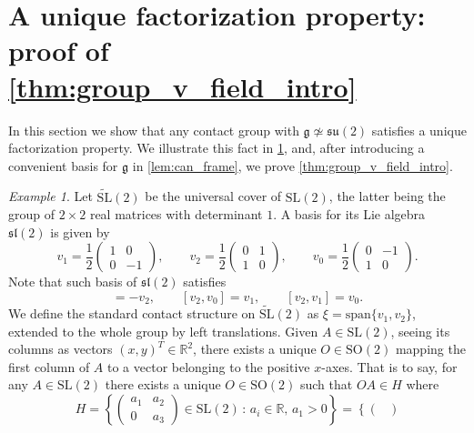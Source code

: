 \documentclass[reqno]{amsart}
\theoremstyle{remark}
\newtheorem{example}[theorem]{Example}
\theoremstyle{plain}
\begin{document}
\section{A unique factorization property: proof of \cref{thm:group_v_field_intro}}\label{4sec:groups}
In this section we show that any contact group with $\mathfrak g\not\simeq \mathfrak{su}(2) $ satisfies a unique factorization property. We illustrate this fact in \cref{ex:st_sl2}, and, after introducing a convenient basis for $\mathfrak g$ in \cref{lem:can_frame}, we prove \cref{thm:group_v_field_intro}.
\begin{example}\label{ex:st_sl2}
    Let $\widetilde{\mathrm{SL}}(2)$ be the universal cover of $\mathrm{SL}(2)$, the latter being the group of $2\times 2$ real matrices with determinant $1$.  A basis for its Lie algebra $\mathfrak{sl}(2)$ is given by \begin{equation}\label{eq:sl2_basis}
        v_1 = \frac{1}{2}\begin{pmatrix} 1 & 0 \\ 0 & -1 \end{pmatrix}, \qquad
v_2 =\frac{1}{2}\begin{pmatrix} 0 & 1 \\ 1 & 0 \end{pmatrix}, \qquad
v_0=\frac{1}{2}\begin{pmatrix} 0 & -1 \\ 1 & 0 \end{pmatrix}.
    \end{equation}
	Note that such basis of $\mathfrak{sl}(2)$ satisfies
	\begin{equation}
		[v_1,v_0]=-v_2,\qquad 
		[v_2,v_0]=v_1,\qquad
		[v_2,v_1]=v_0.
	\end{equation}
    We define the standard contact structure on $\widetilde{\mathrm{SL}}(2)$ as $\xi=\mathrm{span}\{v_1,v_2\}$, extended to the whole group by left translations. Given $A\in \mathrm{SL}(2)$, seeing its columns as vectors $(x,y)^T\in\mathbb R^2$, there exists a unique $O\in \mathrm{SO}(2)$ mapping the first column of $A$ to a vector belonging to the positive $x$-axes. That is to say, for any $A\in \mathrm{SL}(2)$ there exists a unique $O\in \mathrm{SO}(2)$ such that $OA \in H$ where
    \begin{equation}\label{eq:non_comm_2}
        H=\left\{\begin{pmatrix}
        	a_1 & a_2\\
        	0 & a_3
        \end{pmatrix}\in \mathrm{SL}(2)\,:\,a_i\in\mathbb R,\,a_{1}>0\right\}=\left\{\begin{pmatrix}

\end{pmatrix}
\end{equation}
\end{example}
\end{document}
